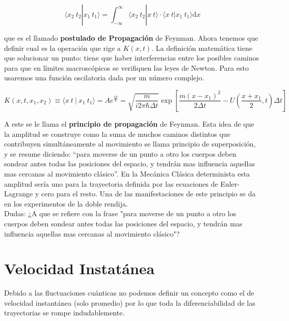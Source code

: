 \documentclass[12pt,a4paper]{article}
\numberwithin{equation}{section}
\numberwithin{figure}{section}
\newcommand{\parentesis}[1]{\left( #1  \right)}
\newcommand{\ccorchetes}[1]{\left[ #1  \right]}
\newcommand{\D}{\mathrm{d}}
\begin{document}
\begin{equation}
\langle x_2 \ t_2 | x_1 \ t_1 \rangle = \int_{-\infty}^{\infty} \langle x_2 \  t_2 | x \  t \rangle \cdot \langle x \ t | x_1 \ t_1 \rangle \D x
\label{Ec:3-Postulado-Propagación}
\end{equation}

que es el llamado \textbf{postulado de Propagación} de Feynman. Ahora tenemos que definir cual es la operación que rige a $K(x,t)$. La definición matemática tiene que solucionar un punto: tiene que haber interferencias entre los posibles caminos para que en límites macroscópicos se verifiquen las leyes de Newton. Para esto usaremos una función oscilatoria dada por un número complejo. 

\begin{equation}
K(x,t,x_1,x_2) \equiv \langle x \ t \ | \ x_1 \  t_1 \rangle = A e^{\frac{i S}{\hbar}} = \sqrt{\frac{m}{i 2 \pi \hbar \Delta t}} \exp \ccorchetes{\dfrac{m (x-x_1)^2}{2 \Delta t} - U \parentesis{\frac{x+x_1}{2},t} \Delta t}
\label{Ec:3-Principio-Propagación}
\end{equation}

A este se le llama el \textbf{principio de propagación} de Feynman. Esta idea de que la amplitud se construye como la suma de muchos caminos distintos que contribuyen simultáneamente al movimiento se llama principio de superposición, y se resume diciendo: ``para moverse de un punto a otro los cuerpos deben sondear antes  todas las posiciones del espacio, y tendrán mas influencia aquellas mas cercanas al movimiento clásico''. En la Mecánica Clásica determinista esta amplitud sería uno para la trayectoria definida por las ecuaciones de Euler-Lagrange y cero para el resto. Una de las manifestaciones de este principio se da en los experimentos de la doble rendija. \\




Dudas: ¿A que se refiere con la frase "para moverse de un punto a otro los cuerpos deben sondear antes  todas las posiciones del espacio, y tendrán mas influencia aquellas mas cercanas al movimiento clásico"?

\section{Velocidad Instatánea}

Debido a las fluctuaciones cuánticas no podemos definir un concepto como el de velocidad instantánea (solo promedio) por lo que toda la diferenciabilidad de las trayectorias se rompe indudablemente. \\
\end{document}
